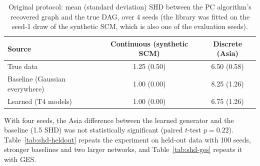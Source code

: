 \documentclass[
  english,
  class=report,
  accentcolor=2c,
  marginpar=false,
  parskip=half-,
  fontsize=11pt,
  ruledheaders=false,
  pdfa=false,
  IMRAD=false,
  thesis={type=master}
]{tudapub}
\begin{document}
\begin{table}[ht]
\caption{Original protocol: mean (standard deviation) SHD between the PC algorithm's recovered graph and the true DAG, over 4 seeds (the library was fitted on the seed-1 draw of the synthetic SCM, which is also one of the evaluation seeds).}
\label{tab:shd}
\centering
\begin{tabular}{lcc}
\toprule
\textbf{Source} & \textbf{Continuous (synthetic SCM)} & \textbf{Discrete (Asia)} \\
\midrule
True data & 1.25 (0.50) & 6.50 (0.58) \\
Baseline (Gaussian everywhere) & 1.00 (0.00) & 8.25 (1.26) \\
Learned (T4 models) & 1.00 (0.00) & 6.75 (1.26) \\
\bottomrule
\end{tabular}
\end{table}

With four seeds, the Asia difference between the learned generator and
the baseline (1.5 SHD) was not statistically significant (paired $t$-test
$p = 0.22$). Table~\ref{tab:shd-heldout} repeats the experiment on held-out
data with 100 seeds, stronger baselines and two larger networks, and
Table~\ref{tab:shd-ges} repeats it with GES.
\end{document}
